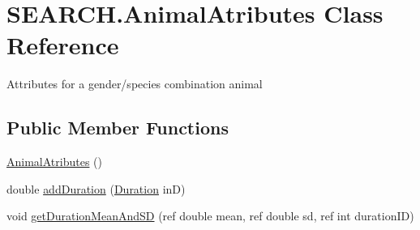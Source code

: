 \hypertarget{class_s_e_a_r_c_h_1_1_animal_atributes}{\section{S\-E\-A\-R\-C\-H.\-Animal\-Atributes Class Reference}
\label{class_s_e_a_r_c_h_1_1_animal_atributes}
}


Attributes for a gender/species combination animal  


\subsection*{Public Member Functions}
\begin{DoxyCompactItemize}
\item 
\hyperlink{class_s_e_a_r_c_h_1_1_animal_atributes_a6f43f288ff9ef744b76d6ee1a2b62be2}{Animal\-Atributes} ()
\item 
double \hyperlink{class_s_e_a_r_c_h_1_1_animal_atributes_a97cd28150a5f6108de05568db7d34c88}{add\-Duration} (\hyperlink{struct_s_e_a_r_c_h_1_1_duration}{Duration} in\-D)
\item 
void \hyperlink{class_s_e_a_r_c_h_1_1_animal_atributes_a23d709722ba91ea5e24ce7779c82e234}{get\-Duration\-Mean\-And\-S\-D} (ref double mean, ref double sd, ref int duration\-I\-D)
\end{DoxyCompactItemize}
